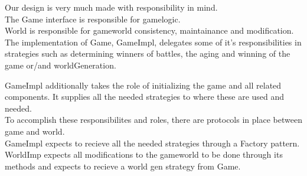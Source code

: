 Our design is very much made with responsibility in mind. \\
 The Game interface is responsible for gamelogic. \\
 World is responsible for gameworld consistency, maintainance and
modification.\\
The implementation of Game, GameImpl, delegates some of it's responsibilities
in strategies such as determining winners of battles, the aging and winning of
the game or/and worldGeneration.

GameImpl additionally takes the role of initializing the game and all related components.
It supplies all the needed strategies to where these are used and needed. \\
 
To accomplish these responsibilites and roles, there are protocols in place
between game and world.\\
 GameImpl expects to recieve all the needed strategies through a Factory
pattern.\\
 WorldImp expects all modifications to the gameworld to be done through its
methods and expects to recieve a world gen strategy from Game.
